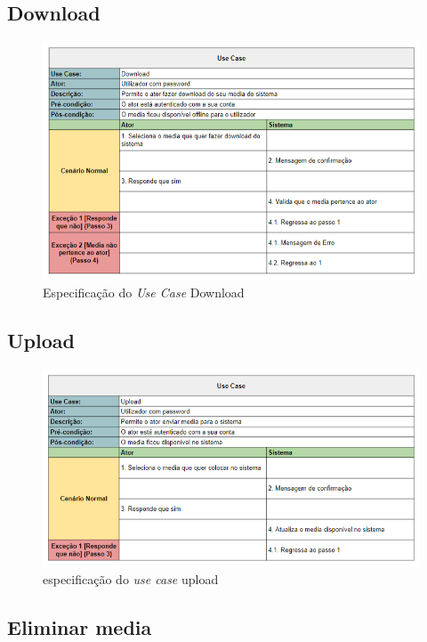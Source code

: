 \documentclass[a4paper]{report}
\begin{document}
\subsection{Download}

\begin{figure}[H]
	\centering 
    \includegraphics[width=\textwidth]{images/Download.png}  
    \caption{Especificação do \emph{Use Case} Download}
\end{figure}

\subsection{Upload}

\begin{figure}[h]
	\centering 
    \includegraphics[width=\textwidth]{images/upload.png}  
    \caption{especificação do \emph{use case} upload}
\end{figure}

\subsection{Eliminar media}
\end{document}

